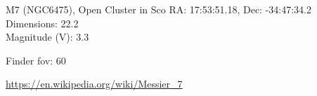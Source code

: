 \begin{block}{M7 (NGC6475), Open Cluster in Sco}
    RA: 17:53:51.18, Dec: -34:47:34.2 \\ 
    Dimensions: 22.2 \\ 
    Magnitude (V): 3.3



    Finder fov: 60 

    \url{https://en.wikipedia.org/wiki/Messier_7} 
\end{block}